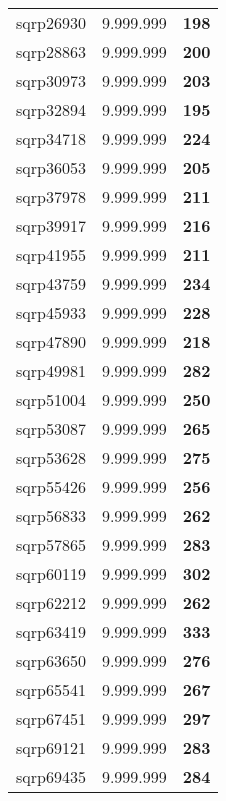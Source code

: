 \begin{tabular}{cc||c}
sqrp26930        & 9.999.999        & {\bf 198}       \\ 
sqrp28863        & 9.999.999        & {\bf 200}       \\ 
sqrp30973        & 9.999.999        & {\bf 203}       \\ 
sqrp32894        & 9.999.999        & {\bf 195}       \\ 
sqrp34718        & 9.999.999        & {\bf 224}       \\ 
sqrp36053        & 9.999.999        & {\bf 205}       \\ 
sqrp37978        & 9.999.999        & {\bf 211}       \\ 
sqrp39917        & 9.999.999        & {\bf 216}       \\ 
sqrp41955        & 9.999.999        & {\bf 211}       \\ 
sqrp43759        & 9.999.999        & {\bf 234}       \\ 
sqrp45933        & 9.999.999        & {\bf 228}       \\ 
sqrp47890        & 9.999.999        & {\bf 218}       \\ 
sqrp49981        & 9.999.999        & {\bf 282}       \\ 
sqrp51004        & 9.999.999        & {\bf 250}       \\ 
sqrp53087        & 9.999.999        & {\bf 265}       \\ 
sqrp53628        & 9.999.999        & {\bf 275}       \\ 
sqrp55426        & 9.999.999        & {\bf 256}       \\ 
sqrp56833        & 9.999.999        & {\bf 262}       \\ 
sqrp57865        & 9.999.999        & {\bf 283}       \\ 
sqrp60119        & 9.999.999        & {\bf 302}       \\ 
sqrp62212        & 9.999.999        & {\bf 262}       \\ 
sqrp63419        & 9.999.999        & {\bf 333}       \\ 
sqrp63650        & 9.999.999        & {\bf 276}       \\ 
sqrp65541        & 9.999.999        & {\bf 267}       \\ 
sqrp67451        & 9.999.999        & {\bf 297}       \\ 
sqrp69121        & 9.999.999        & {\bf 283}       \\ 
sqrp69435        & 9.999.999        & {\bf 284}       \\ 

\end{tabular}

